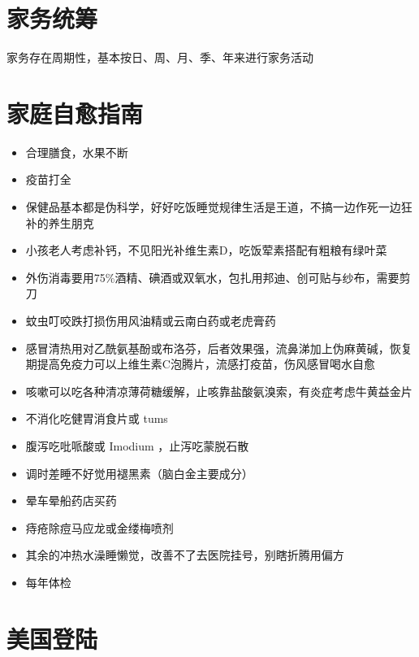 \documentclass[
  letterpaper,
  DIV=11,
  numbers=noendperiod]{scrreprt}
\providecommand{\tightlist}{%
  \setlength{\itemsep}{0pt}\setlength{\parskip}{0pt}}\usepackage{longtable,booktabs,array}
\begin{document}
\section{家务统筹}\label{ux5bb6ux52a1ux7edfux7b79}

家务存在周期性，基本按日、周、月、季、年来进行家务活动

\section{家庭自愈指南}\label{ux5bb6ux5eadux81eaux6108ux6307ux5357}

\begin{itemize}
\tightlist
\item
  合理膳食，水果不断
\item
  疫苗打全
\item
  保健品基本都是伪科学，好好吃饭睡觉规律生活是王道，不搞一边作死一边狂补的养生朋克
\item
  小孩老人考虑补钙，不见阳光补维生素D，吃饭荤素搭配有粗粮有绿叶菜
\item
  外伤消毒要用75\%酒精、碘酒或双氧水，包扎用邦迪、创可贴与纱布，需要剪刀
\item
  蚊虫叮咬跌打损伤用风油精或云南白药或老虎膏药
\item
  感冒清热用对乙酰氨基酚或布洛芬，后者效果强，流鼻涕加上伪麻黄碱，恢复期提高免疫力可以上维生素C泡腾片，流感打疫苗，伤风感冒喝水自愈
\item
  咳嗽可以吃各种清凉薄荷糖缓解，止咳靠盐酸氨溴索，有炎症考虑牛黄益金片
\item
  不消化吃健胃消食片或 tums
\item
  腹泻吃吡哌酸或 Imodium ，止泻吃蒙脱石散
\item
  调时差睡不好觉用褪黑素（脑白金主要成分）
\item
  晕车晕船药店买药
\item
  痔疮除痘马应龙或金缕梅喷剂
\item
  其余的冲热水澡睡懒觉，改善不了去医院挂号，别瞎折腾用偏方
\item
  每年体检
\end{itemize}

\section{美国登陆}\label{ux7f8eux56fdux767bux9646}
\end{document}
